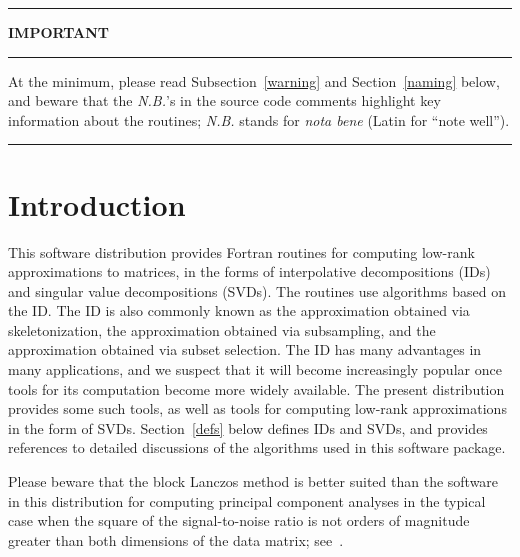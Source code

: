 \documentclass[letterpaper,12pt]{article}
\begin{document}
\newpage

\tableofcontents

\newpage



\hrule

\medskip

\centerline{\Large \bf IMPORTANT}

\medskip

\hrule

\medskip

\noindent At the minimum, please read Subsection~\ref{warning}
and Section~\ref{naming} below, and beware that the {\it N.B.}'s
in the source code comments highlight key information about the routines;
{\it N.B.} stands for {\it nota bene} (Latin for ``note well'').

\medskip

\hrule

\bigskip



\section{Introduction}

This software distribution provides Fortran routines
for computing low-rank approximations to matrices,
in the forms of interpolative decompositions (IDs)
and singular value decompositions (SVDs).
The routines use algorithms based on the ID.
The ID is also commonly known as
the approximation obtained via skeletonization,
the approximation obtained via subsampling,
and the approximation obtained via subset selection.
The ID has many advantages in many applications,
and we suspect that it will become increasingly popular
once tools for its computation become more widely available.
The present distribution provides some such tools,
as well as tools for computing low-rank approximations
in the form of SVDs.
Section~\ref{defs} below defines IDs and SVDs,
and provides references to detailed discussions of the algorithms
used in this software package.

Please beware that the block Lanczos method is better suited than
the software in this distribution for computing principal component analyses
in the typical case when the square of the signal-to-noise ratio
is not orders of magnitude greater than both dimensions of the data matrix;
see~\cite{rokhlin-szlam-tygert}.
\end{document}
